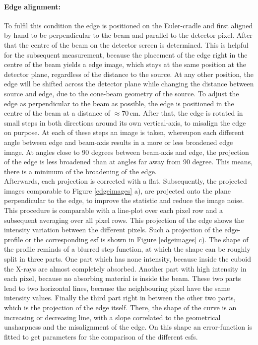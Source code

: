 \paragraph{Edge alignment:} \label{alignment}
To fulfil this condition the edge is positioned on the Euler-cradle and first aligned by hand to be perpendicular to the beam and parallel to the detector pixel. After that the centre of the beam on the detector screen is determined. This is helpful for the subsequent measurement, because the placement of the edge right in the centre of the beam yields a edge image, which stays at the same position at the detector plane, regardless of the distance to the source. At any other position, the edge will be shifted across the detector plane while changing the distance between source and edge, due to the cone-beam geometry of the source. To adjust the edge as perpendicular to the beam as possible, the edge is positioned in the centre of the beam at a distance of $\approx 70\,$cm. After that, the edge is rotated in small steps in both directions around its own vertical-axis, to misalign the edge on purpose. At each of these steps an image is taken, whereupon each different angle between edge and beam-axis results in a more or less broadened edge image. At angles close to 90 degrees between beam-axis and edge, the projection of the edge is less broadened than at angles far away from 90 degree. This means, there is a minimum of the broadening of the edge.\\ 
Afterwards, each projection is corrected with a \gls{flat}. Subsequently, the projected images comparable to Figure \ref{edgeimages} a), are projected onto the plane perpendicular to the edge, to improve the statistic and reduce the image noise. This procedure is comparable with a line-plot over each pixel row and a subsequent averaging over all pixel rows. This projection of the edge shows the intensity variation between the different pixels. Such a projection of the edge-profile or the corresponding \gls{esf} is shown in Figure \ref{edgeimages} c). The shape of the profile reminds of a blurred step function, at which the shape can be roughly split in three parts. One part which has none intensity, because inside the cuboid the X-rays are almost completely absorbed. Another part with high intensity in each pixel, because no absorbing material is inside the beam. These two parts lead to two horizontal lines, because the neighbouring pixel have the same intensity values. Finally the third part right in between the other two parts, which is the projection of the edge itself. There, the shape of the curve is an increasing or decreasing line, with a slope correlated to the geometrical unsharpness and the misalignment of the edge. On this shape an error-function is fitted to get parameters for the comparison of the different \glspl{esf}.\\
